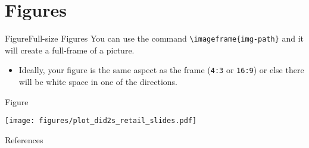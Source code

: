 \documentclass[aspectratio=169,t,11pt,table]{beamer}
\begin{document}
\section{Figures}


\begin{frame}{Figure}{Full-size Figures}
  You can use the command \texttt{\textbackslash imageframe\{img-path\}} and it will create a full-frame of a picture. 
  
  \begin{itemize}
  \item Ideally, your figure is the same aspect as the frame (\texttt{4:3} or \texttt{16:9}) or else there will be white space in one of the directions.
  \end{itemize}
\end{frame}

\begin{frame}{Figure}
  \begin{adjustbox}{width = 0.75\textwidth, center}
    \texttt{[image: figures/plot\_did2s\_retail\_slides.pdf]}
  \end{adjustbox}
\end{frame}

\begin{frame}{References}
  \thispagestyle{empty}
  \printbibliography
\end{frame}
\appendix
\end{document}
